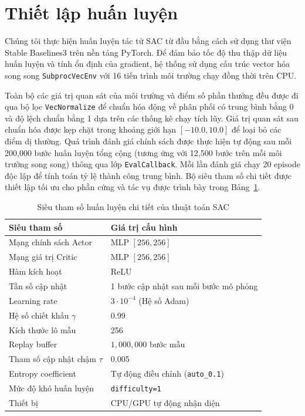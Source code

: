 \documentclass[conference]{IEEEtran}
\begin{document}
\section{Thiết lập huấn luyện}
Chúng tôi thực hiện huấn luyện tác tử SAC từ đầu bằng cách sử dụng thư viện Stable Baselines3 \cite{raffin2021stable, sb3sac} trên nền tảng PyTorch. Để đảm bảo tốc độ thu thập dữ liệu huấn luyện và tính ổn định của gradient, hệ thống sử dụng cấu trúc vector hóa song song \texttt{SubprocVecEnv} với 16 tiến trình môi trường chạy đồng thời trên CPU. 

Toàn bộ các giá trị quan sát của môi trường và điểm số phần thưởng đều được đi qua bộ lọc \texttt{VecNormalize} \cite{sb3vec} để chuẩn hóa động về phân phối có trung bình bằng 0 và độ lệch chuẩn bằng 1 dựa trên các thống kê chạy tích lũy. Giá trị quan sát sau chuẩn hóa được kẹp chặt trong khoảng giới hạn $[-10.0, 10.0]$ để loại bỏ các điểm dị thường. Quá trình đánh giá chính sách được thực hiện tự động sau mỗi 200,000 bước huấn luyện tổng cộng (tương ứng với 12,500 bước trên mỗi môi trường song song) thông qua lớp \texttt{EvalCallback}. Mỗi lần đánh giá chạy 20 episode độc lập để tính toán tỷ lệ thành công trung bình. Bộ siêu tham số chi tiết được thiết lập tối ưu cho phần cứng và tác vụ được trình bày trong Bảng~\ref{tab:hyperparameters}.

\begin{table}[!t]
\caption{Siêu tham số huấn luyện chi tiết của thuật toán SAC}
\label{tab:hyperparameters}
\centering
\scriptsize
\begin{tabularx}{\columnwidth}{@{}p{}X@{}}
\toprule
Siêu tham số & Giá trị cấu hình\\
\midrule
Mạng chính sách Actor & MLP $[256, 256]$\\
Mạng giá trị Critic & MLP $[256, 256]$\\
Hàm kích hoạt & ReLU\\
Tần số cập nhật & 1 bước cập nhật sau mỗi bước mô phỏng\\
Learning rate & $3 \cdot 10^{-4}$ (Hệ số Adam)\\
Hệ số chiết khấu $\gamma$ & 0.99\\
Kích thước lô mẫu & 256\\
Replay buffer & $1,000,000$ bước mẫu\\
Tham số cập nhật chậm $\tau$ & 0.005\\
Entropy coefficient & Tự động điều chỉnh (\texttt{auto\_0.1})\\
Mức độ khó huấn luyện & \texttt{difficulty=1}\\
Thiết bị & CPU/GPU tự động nhận diện\\
\bottomrule
\end{tabularx}
\end{table}
\end{document}
